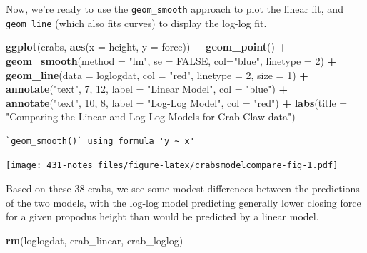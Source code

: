 \documentclass[
]{book}
\newenvironment{Shaded}{\begin{snugshade}}{\end{snugshade}}
\newcommand{\DataTypeTok}[1]{\textcolor[rgb]{0.13,0.29,0.53}{#1}}
\newcommand{\DecValTok}[1]{\textcolor[rgb]{0.00,0.00,0.81}{#1}}
\newcommand{\KeywordTok}[1]{\textcolor[rgb]{0.13,0.29,0.53}{\textbf{#1}}}
\newcommand{\NormalTok}[1]{#1}
\newcommand{\OperatorTok}[1]{\textcolor[rgb]{0.81,0.36,0.00}{\textbf{#1}}}
\newcommand{\OtherTok}[1]{\textcolor[rgb]{0.56,0.35,0.01}{#1}}
\newcommand{\StringTok}[1]{\textcolor[rgb]{0.31,0.60,0.02}{#1}}
\begin{document}
Now, we're ready to use the \texttt{geom\_smooth} approach to plot the linear fit, and \texttt{geom\_line} (which also fits curves) to display the log-log fit.

\begin{Shaded}
\begin{Highlighting}[]
\KeywordTok{ggplot}\NormalTok{(crabs, }\KeywordTok{aes}\NormalTok{(}\DataTypeTok{x =}\NormalTok{ height, }\DataTypeTok{y =}\NormalTok{ force)) }\OperatorTok{+}
\StringTok{    }\KeywordTok{geom_point}\NormalTok{() }\OperatorTok{+}
\StringTok{    }\KeywordTok{geom_smooth}\NormalTok{(}\DataTypeTok{method =} \StringTok{"lm"}\NormalTok{, }\DataTypeTok{se =} \OtherTok{FALSE}\NormalTok{, }\DataTypeTok{col=}\StringTok{"blue"}\NormalTok{, }\DataTypeTok{linetype =} \DecValTok{2}\NormalTok{) }\OperatorTok{+}
\StringTok{    }\KeywordTok{geom_line}\NormalTok{(}\DataTypeTok{data =}\NormalTok{ loglogdat, }\DataTypeTok{col =} \StringTok{"red"}\NormalTok{, }\DataTypeTok{linetype =} \DecValTok{2}\NormalTok{, }\DataTypeTok{size =} \DecValTok{1}\NormalTok{) }\OperatorTok{+}
\StringTok{    }\KeywordTok{annotate}\NormalTok{(}\StringTok{"text"}\NormalTok{, }\DecValTok{7}\NormalTok{, }\DecValTok{12}\NormalTok{, }\DataTypeTok{label =} \StringTok{"Linear Model"}\NormalTok{, }\DataTypeTok{col =} \StringTok{"blue"}\NormalTok{) }\OperatorTok{+}
\StringTok{    }\KeywordTok{annotate}\NormalTok{(}\StringTok{"text"}\NormalTok{, }\DecValTok{10}\NormalTok{, }\DecValTok{8}\NormalTok{, }\DataTypeTok{label =} \StringTok{"Log-Log Model"}\NormalTok{, }\DataTypeTok{col =} \StringTok{"red"}\NormalTok{) }\OperatorTok{+}
\StringTok{    }\KeywordTok{labs}\NormalTok{(}\DataTypeTok{title =} \StringTok{"Comparing the Linear and Log-Log Models for Crab Claw data"}\NormalTok{)}
\end{Highlighting}
\end{Shaded}

\begin{verbatim}
`geom_smooth()` using formula 'y ~ x'
\end{verbatim}

\texttt{[image: 431-notes\_files/figure-latex/crabsmodelcompare-fig-1.pdf]}

Based on these 38 crabs, we see some modest differences between the predictions of the two models, with the log-log model predicting generally lower closing force for a given propodus height than would be predicted by a linear model.

\begin{Shaded}
\begin{Highlighting}[]
\KeywordTok{rm}\NormalTok{(loglogdat, crab_linear, crab_loglog)}
\end{Highlighting}
\end{Shaded}
\end{document}
